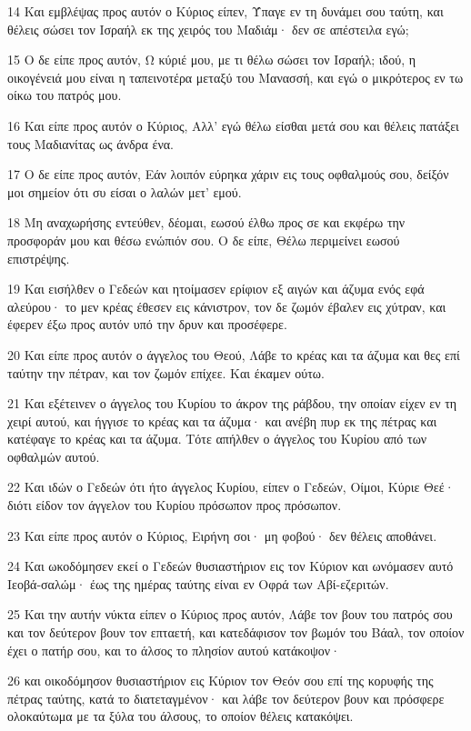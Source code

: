 \par 14 Και εμβλέψας προς αυτόν ο Κύριος είπεν, Ύπαγε εν τη δυνάμει σου ταύτη, και θέλεις σώσει τον Ισραήλ εκ της χειρός του Μαδιάμ· δεν σε απέστειλα εγώ;
\par 15 Ο δε είπε προς αυτόν, Ω κύριέ μου, με τι θέλω σώσει τον Ισραήλ; ιδού, η οικογένειά μου είναι η ταπεινοτέρα μεταξύ του Μανασσή, και εγώ ο μικρότερος εν τω οίκω του πατρός μου.
\par 16 Και είπε προς αυτόν ο Κύριος, Αλλ' εγώ θέλω είσθαι μετά σου και θέλεις πατάξει τους Μαδιανίτας ως άνδρα ένα.
\par 17 Ο δε είπε προς αυτόν, Εάν λοιπόν εύρηκα χάριν εις τους οφθαλμούς σου, δείξόν μοι σημείον ότι συ είσαι ο λαλών μετ' εμού.
\par 18 Μη αναχωρήσης εντεύθεν, δέομαι, εωσού έλθω προς σε και εκφέρω την προσφοράν μου και θέσω ενώπιόν σου. Ο δε είπε, Θέλω περιμείνει εωσού επιστρέψης.
\par 19 Και εισήλθεν ο Γεδεών και ητοίμασεν ερίφιον εξ αιγών και άζυμα ενός εφά αλεύρου· το μεν κρέας έθεσεν εις κάνιστρον, τον δε ζωμόν έβαλεν εις χύτραν, και έφερεν έξω προς αυτόν υπό την δρυν και προσέφερε.
\par 20 Και είπε προς αυτόν ο άγγελος του Θεού, Λάβε το κρέας και τα άζυμα και θες επί ταύτην την πέτραν, και τον ζωμόν επίχεε. Και έκαμεν ούτω.
\par 21 Και εξέτεινεν ο άγγελος του Κυρίου το άκρον της ράβδου, την οποίαν είχεν εν τη χειρί αυτού, και ήγγισε το κρέας και τα άζυμα· και ανέβη πυρ εκ της πέτρας και κατέφαγε το κρέας και τα άζυμα. Τότε απήλθεν ο άγγελος του Κυρίου από των οφθαλμών αυτού.
\par 22 Και ιδών ο Γεδεών ότι ήτο άγγελος Κυρίου, είπεν ο Γεδεών, Οίμοι, Κύριε Θεέ· διότι είδον τον άγγελον του Κυρίου πρόσωπον προς πρόσωπον.
\par 23 Και είπε προς αυτόν ο Κύριος, Ειρήνη σοι· μη φοβού· δεν θέλεις αποθάνει.
\par 24 Και ωκοδόμησεν εκεί ο Γεδεών θυσιαστήριον εις τον Κύριον και ωνόμασεν αυτό Ιεοβά-σαλώμ· έως της ημέρας ταύτης είναι εν Οφρά των Αβί-εζεριτών.
\par 25 Και την αυτήν νύκτα είπεν ο Κύριος προς αυτόν, Λάβε τον βουν του πατρός σου και τον δεύτερον βουν τον επταετή, και κατεδάφισον τον βωμόν του Βάαλ, τον οποίον έχει ο πατήρ σου, και το άλσος το πλησίον αυτού κατάκοψον·
\par 26 και οικοδόμησον θυσιαστήριον εις Κύριον τον Θεόν σου επί της κορυφής της πέτρας ταύτης, κατά το διατεταγμένον· και λάβε τον δεύτερον βουν και πρόσφερε ολοκαύτωμα με τα ξύλα του άλσους, το οποίον θέλεις κατακόψει.
